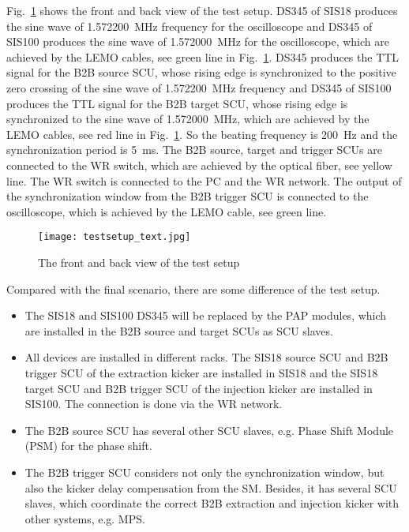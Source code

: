 Fig.~\ref{testsetup_text} shows the front and back view of the test setup. DS345 of SIS18 produces the sine wave of \SI{1.572200}{\MHz} frequency for the oscilloscope and DS345 of SIS100 produces the sine wave of \SI{1.572000}{\MHz} for the oscilloscope, which are achieved by the LEMO cables, see green line in Fig.~\ref{testsetup_text}. DS345 produces the TTL signal for the B2B source SCU, whose rising edge is synchronized to the positive zero crossing of the sine wave of \SI{1.572200}{\MHz} frequency and DS345 of SIS100 produces the TTL signal for the B2B target SCU, whose rising edge is synchronized to the sine wave of \SI{1.572000}{\MHz}, which are achieved by the LEMO cables, see red line in Fig.~\ref{testsetup_text}. So the beating frequency is \SI{200}{\Hz} and the synchronization period is \SI{5}{\ms}. The B2B source, target and trigger SCUs are connected to the WR switch, which are achieved by the optical fiber, see yellow line. The WR switch is connected to the PC and the WR network. The output of the synchronization window from the B2B trigger SCU is connected to the oscilloscope, which is achieved by the LEMO cable, see green line. 

\begin{figure}[!htb]
   \centering   
   \texttt{[image: testsetup\_text.jpg]}
   \caption{The front and back view of the test setup}
   \label{testsetup_text}
\end{figure}

Compared with the final scenario, there are some difference of the test setup.
\begin{itemize}
\item
The SIS18 and SIS100 DS345 will be replaced by the PAP modules, which are installed in the B2B source and target SCUs as SCU slaves. 
\item 
All devices are installed in different racks. The SIS18 source SCU and B2B trigger SCU of the extraction kicker are installed in SIS18 and the SIS18 target SCU and B2B trigger SCU of the injection kicker are installed in SIS100. The connection is done via the WR network. 
\item 
The B2B source SCU has several other SCU slaves, e.g. Phase Shift Module (PSM) for the phase shift. 
\item 
The B2B trigger SCU considers not only the synchronization window, but also the kicker delay compensation from the SM. Besides, it has several SCU slaves, which coordinate the correct B2B extraction and injection kicker with other systems, e.g. MPS.
\end{itemize}

